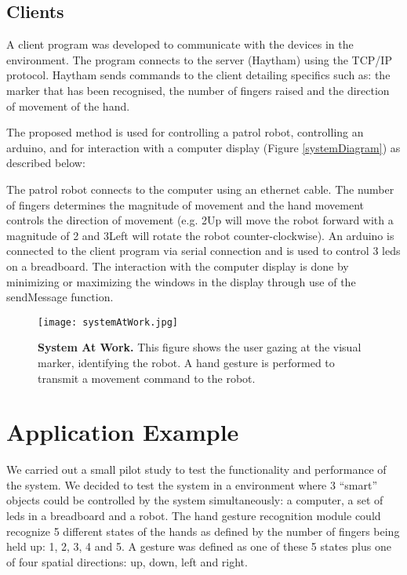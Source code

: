 \documentclass[jou,a4paper,notxfonts]{apa}
\begin{document}
\subsection{Clients}
A client program was developed to communicate with the devices in the environment. The program connects to the server (Haytham) using the TCP/IP protocol. Haytham sends commands to the client detailing specifics such as: the marker that has been recognised, the number of fingers raised and the direction of movement of the hand. 

The proposed method is used for controlling a patrol robot, controlling an arduino, and for interaction with a computer display (Figure \ref{systemDiagram}) as described below:

The patrol robot connects to the computer using an ethernet cable. The number of fingers determines the magnitude of movement and the hand movement controls the direction of movement (e.g. 2Up will move the robot forward with a magnitude of 2 and 3Left will rotate the robot counter-clockwise). An arduino is connected to the client program via serial connection and is used to control 3 leds on a breadboard. The interaction with the computer display is done by minimizing or maximizing the windows in the display through use of the sendMessage function.

\begin{figure}[tp]
 \texttt{[image: systemAtWork.jpg]}
 \caption{\textbf{System At Work.} This figure shows the user gazing at the visual marker, identifying the robot. A hand gesture is performed to transmit a movement command to the robot.}
 \label{systemAtWork}
\end{figure}

\section{Application Example}
We carried out a small pilot study to test the functionality and performance of the system. We decided to test the
system in a environment where 3 ``smart'' objects could be controlled by the system simultaneously: a computer, a set of
leds in a breadboard and a robot. The hand gesture recognition module could recognize 5 different states of the hands
as defined by the number of fingers being held up: 1, 2, 3, 4 and 5. A gesture was defined as one of these 5 states plus
one of four spatial directions: up, down, left and right.
\end{document}
